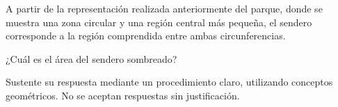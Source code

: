 A partir de la representación realizada anteriormente del parque, donde se muestra una zona circular y una región central más pequeña, el sendero corresponde a la región comprendida entre ambas circunferencias.

¿Cuál es el área del sendero sombreado?

Sustente su respuesta mediante un procedimiento claro, utilizando conceptos geométricos. No se aceptan respuestas sin justificación.